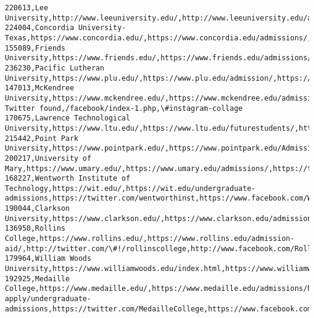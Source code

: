 \documentclass[11pt]{article}
\begin{document}
\begin{Verbatim}[commandchars=\\\{\}]
220613,Lee University,http://www.leeuniversity.edu/,http://www.leeuniversity.edu/admissions/,http://twitter.com/leeu,http://www.facebook.com/LeeUniversity,http://instagram.com/leeuniversity
224004,Concordia University-Texas,https://www.concordia.edu/,https://www.concordia.edu/admissions/,https://twitter.com/concordiatx,https://www.facebook.com/concordiatx,https://www.instagram.com/concordiatx
155089,Friends University,https://www.friends.edu/,https://www.friends.edu/admissions/,https://twitter.com/friendsu,https://www.facebook.com/FriendsUniversity,https://instagram.com/friendsu/
236230,Pacific Lutheran University,https://www.plu.edu/,https://www.plu.edu/admission/,https://twitter.com/PLUNEWS,https://www.facebook.com/Pacific.Lutheran.University,https://instagram.com/pacificlutheran
147013,McKendree University,https://www.mckendree.edu/,https://www.mckendree.edu/admission/,No Twitter found,/facebook/index-1.php,\#instagram-collage
170675,Lawrence Technological University,https://www.ltu.edu/,https://www.ltu.edu/futurestudents/,https://twitter.com/LawrenceTechU,https://www.facebook.com/lawrencetechu,https://www.instagram.com/lawrencetechu/
215442,Point Park University,https://www.pointpark.edu/,https://www.pointpark.edu/Admissions/index,https://twitter.com/pointparku,https://www.facebook.com/PointParkU,https://www.instagram.com/PointParkU/
200217,University of Mary,https://www.umary.edu/,https://www.umary.edu/admissions/,https://twitter.com/umary,https://www.facebook.com/universityofmary,https://instagram.com/universityofmary
168227,Wentworth Institute of Technology,https://wit.edu/,https://wit.edu/undergraduate-admissions,https://twitter.com/wentworthinst,https://www.facebook.com/WentworthInst,https://www.instagram.com/wentworthinstitute/
190044,Clarkson University,https://www.clarkson.edu/,https://www.clarkson.edu/admissions,https://twitter.com/ClarksonUniv,https://www.facebook.com/ClarksonUniversity,https://www.instagram.com/clarksonuniv/
136950,Rollins College,https://www.rollins.edu/,https://www.rollins.edu/admission-aid/,http://twitter.com/\#!/rollinscollege,http://www.facebook.com/Rollins.College,http://instagram.com/rollinscollege
179964,William Woods University,https://www.williamwoods.edu/index.html,https://www.williamwoods.edu/admissions/index.html,http://twitter.com/WilliamWoodsU,http://www.facebook.com/WilliamWoodsUniversity,https://www.instagram.com/WilliamWoodsU/
192925,Medaille College,https://www.medaille.edu/,https://www.medaille.edu/admissions/how-apply/undergraduate-admissions,https://twitter.com/MedailleCollege,https://www.facebook.com/medaillecollege,http://instagram.com/medaillecollege

\end{Verbatim}
\end{document}
